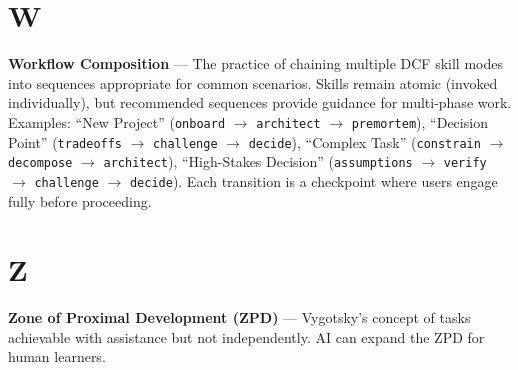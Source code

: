 \section*{W}

\textbf{Workflow Composition} --- The practice of chaining multiple DCF skill modes into sequences appropriate for common scenarios. Skills remain atomic (invoked individually), but recommended sequences provide guidance for multi-phase work. Examples: ``New Project'' (\texttt{onboard} $\rightarrow$ \texttt{architect} $\rightarrow$ \texttt{premortem}), ``Decision Point'' (\texttt{tradeoffs} $\rightarrow$ \texttt{challenge} $\rightarrow$ \texttt{decide}), ``Complex Task'' (\texttt{constrain} $\rightarrow$ \texttt{decompose} $\rightarrow$ \texttt{architect}), ``High-Stakes Decision'' (\texttt{assumptions} $\rightarrow$ \texttt{verify} $\rightarrow$ \texttt{challenge} $\rightarrow$ \texttt{decide}). Each transition is a checkpoint where users engage fully before proceeding.

\section*{Z}

\textbf{Zone of Proximal Development (ZPD)} --- Vygotsky's concept of tasks achievable with assistance but not independently. AI can expand the ZPD for human learners.


